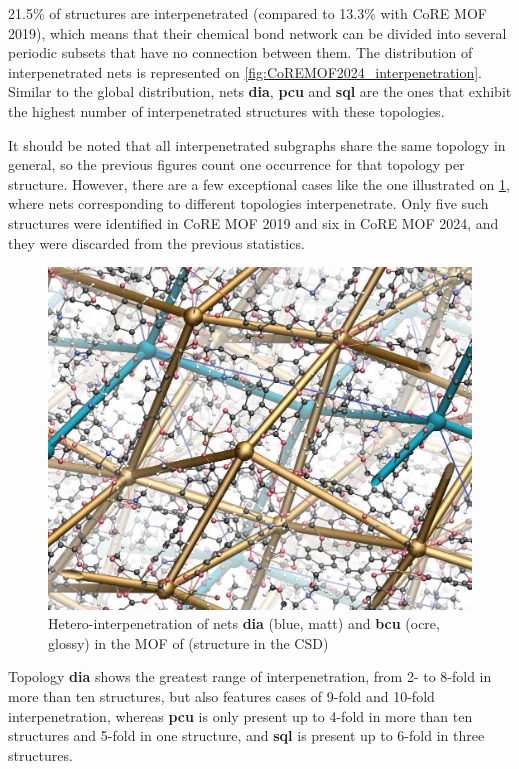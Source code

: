\documentclass[main.tex]{subfiles}
\begin{document}
\num{21.5}\% of structures are interpenetrated (compared to \num{13.3}\% with CoRE MOF 2019), which means that their chemical bond network can be divided into several periodic subsets that have no connection between them. The distribution of interpenetrated nets is represented on \cref{fig:CoREMOF2024_interpenetration}. Similar to the global distribution, nets \textbf{dia}, \textbf{pcu} and \textbf{sql} are the ones that exhibit the highest number of interpenetrated structures with these topologies.

It should be noted that all interpenetrated subgraphs share the same topology in general, so the previous figures count one occurrence for that topology per structure. However, there are a few exceptional cases like the one illustrated on \cref{fig:interpenetration}, where nets corresponding to different topologies interpenetrate. Only five such structures were identified in CoRE MOF 2019 and six in CoRE MOF 2024, and they were discarded from the previous statistics.

\begin{figure}
	\centering
	\includegraphics[width=0.9\linewidth]{figures/topology/WEBZEKinterpenetration.jpg}
	\caption{Hetero-interpenetration of nets \textbf{dia} (blue, matt) and \textbf{bcu} (ocre, glossy) in the MOF of \textcite{Heterointerpenetration} (structure  in the CSD\autocite{CSD})}\label{fig:interpenetration}
\end{figure}

Topology \textbf{dia} shows the greatest range of interpenetration, from 2- to 8-fold in more than ten structures, but also features cases of 9-fold and 10-fold interpenetration, whereas \textbf{pcu} is only present up to 4-fold in more than ten structures and 5-fold in one structure, and \textbf{sql} is present up to 6-fold in three structures.
\end{document}
